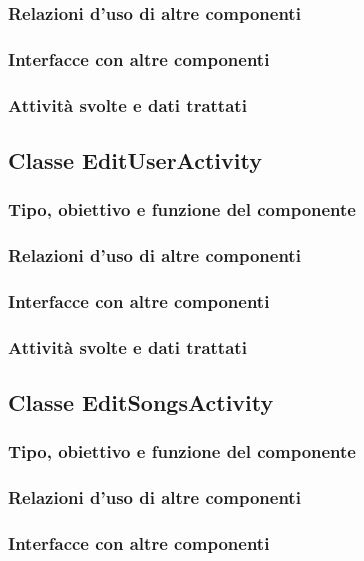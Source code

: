 \subsubsection*{Relazioni d'uso di altre componenti}
\subsubsection*{Interfacce con altre componenti}
\subsubsection*{Attivit\`a svolte e dati trattati}

\subsection{Classe EditUserActivity}
\subsubsection*{Tipo, obiettivo e funzione del componente}
\subsubsection*{Relazioni d'uso di altre componenti}
\subsubsection*{Interfacce con altre componenti}
\subsubsection*{Attivit\`a svolte e dati trattati}

\subsection{Classe EditSongsActivity}
\subsubsection*{Tipo, obiettivo e funzione del componente}
\subsubsection*{Relazioni d'uso di altre componenti}
\subsubsection*{Interfacce con altre componenti}
